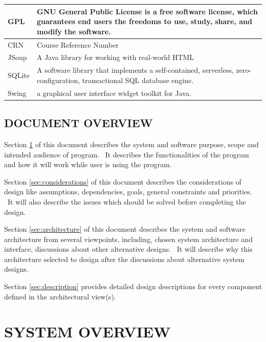 \documentclass[twoside,letterpaper]{article}
\begin{document}
\begin{flushleft}
\begin{longtable}{|m{1.3587599in}|m{5.00806in}|}
GPL &
GNU General Public License is a free software license, which guarantees end users the freedoms to use, study, share, and modify the software. 
\\\hline
CRN &
Course Reference Number  
\\\hline
JSoup &
 A Java library for working with real-world HTML  
\\\hline
SQLite &
A software library that implements a self-contained, serverless, zero-configuration, transactional SQL database engine.  
\\\hline
Swing &
 a graphical user interface widget toolkit for Java.
\\\hline
\end{longtable}
\end{flushleft}

\smallskip

\subsection{DOCUMENT OVERVIEW}

\noindent
Section \ref{sec:overview} of this document describes the system and software purpose, scope and intended audience of program. \ 
It describes the functionalities of the program and how it will work while user is using the program. 

\bigskip

\noindent
Section \ref{sec:considerations} of this document describes the considerations of design like assumptions, dependencies, goals, general constraints and priorities. \ It will also describe the issues which should be solved before completing the design.

\bigskip

\noindent
Section \ref{sec:architecture} of this document describes the system and software architecture from several viewpoints, including, chosen system architecture and interface, discussions about other alternative designs. \ It will describe why this architecture selected to design after the discussions about alternative system designs.

\bigskip

\noindent
Section \ref{sec:description} provides detailed design descriptions for every component defined in the architectural view(s). 

\clearpage\pagestyle{Standard}
\section{SYSTEM OVERVIEW}
\label{sec:overview}
\end{document}
